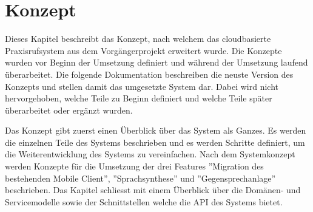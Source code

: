 \section{Konzept}

Dieses Kapitel beschreibt das Konzept, nach welchem das cloudbasierte Praxisrufsystem aus dem Vorgängerprojekt erweitert wurde.
Die Konzepte wurden vor Beginn der Umsetzung definiert und während der Umsetzung laufend überarbeitet.
Die folgende Dokumentation beschreiben die neuste Version des Konzepts und stellen damit das umgesetzte System dar.
Dabei wird nicht hervorgehoben, welche Teile zu Beginn definiert und welche Teile später überarbeitet oder ergänzt wurden.

Das Konzept gibt zuerst einen Überblick über das System als Ganzes.
Es werden die einzelnen Teile des Systems beschrieben und es werden Schritte definiert, um die Weiterentwicklung des Systems zu vereinfachen.
Nach dem Systemkonzept werden Konzepte für die Umsetzung der drei Features ''Migration des bestehenden Mobile Client'', ''Sprachsynthese'' und ''Gegensprechanlage'' beschrieben.
Das Kapitel schliesst mit einem Überblick über die Domänen- und Servicemodelle sowie der Schnittstellen welche die API des Systems bietet.






